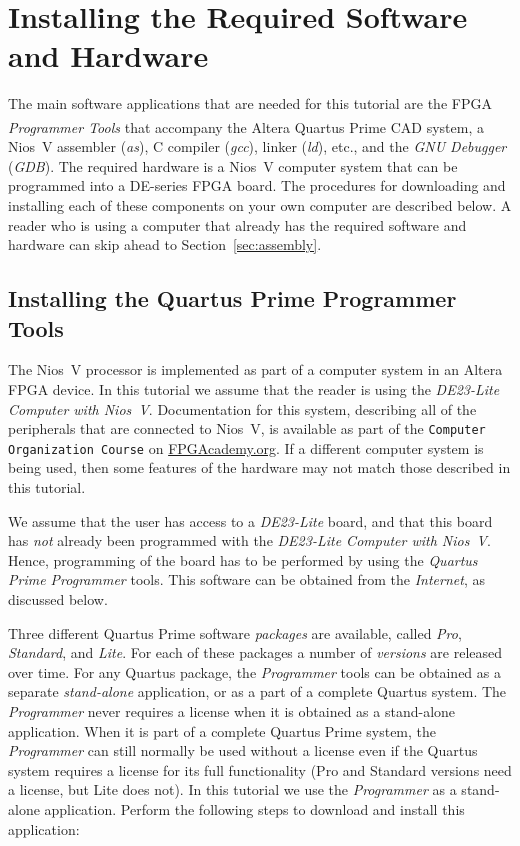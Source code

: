 \documentclass[11pt, twoside, pdftex]{article}
\begin{document}
\section{Installing the Required Software and Hardware}
\label{sec:getthem}

The main software applications that are needed for this tutorial are the FPGA {\it Programmer
Tools} that accompany the Altera Quartus\textsuperscript{\textregistered} Prime CAD system,
a Nios~V assembler ({\it as}), C compiler ({\it gcc}), linker ({\it ld}),
etc., and the {\it GNU Debugger} ({\it GDB}).  The required hardware is a Nios~V computer
system that can be programmed into a DE-series FPGA board. The procedures for downloading and 
installing each of these components on your own computer are described below. A reader who 
is using a computer that already has the required software and hardware can skip ahead to 
Section~\ref{sec:assembly}. 

\subsection{Installing the Quartus Prime Programmer Tools}
\label{sec:programmer}

The Nios~V processor is implemented as part of a computer system in an Altera FPGA device. 
In this tutorial we assume that the reader is using the {\it DE23-Lite Computer with Nios~V}.
Documentation for this system, describing all of the peripherals that are
connected to Nios~V, is available as part of the \texttt{Computer Organization Course} 
on {\small \href{https://www.fpgacademy.org/courses.html} {FPGAcademy.org}}. If a
different computer system is being used, then some features of the hardware may not match
those described in this tutorial.

We assume that the user has access to a {\it DE23-Lite} board, and that this board has {\it not} 
already been programmed with the {\it DE23-Lite Computer with Nios~V}. Hence, programming of 
the board has to be performed by using the {\it Quartus Prime Programmer} tools. This 
software can be obtained from the {\it Internet}, as discussed below. 

Three different Quartus Prime software {\it packages} are available, called {\it Pro},
{\it Standard}, and {\it Lite}. For each of these packages a number of {\it versions} are
released over time.  For any Quartus package, the {\it Programmer} tools can be 
obtained as a separate {\it stand-alone} application, or as a part of a complete 
Quartus system. The {\it Programmer} never requires a license when it is obtained as a
stand-alone application. When it is part of a complete Quartus Prime system, the
{\it Programmer} can still normally be used without a license even if the Quartus system 
requires a license for its full functionality (Pro and Standard versions need a license, but 
Lite does not). In this tutorial we use the {\it Programmer} as a stand-alone application. 
Perform the following steps to download and install this application:
\end{document}
